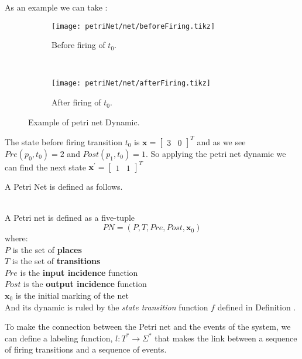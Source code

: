 As an example we can take :
\begin{figure}[H]
  \centering
 \begin{subfigure}[t]{0.45\textwidth}
  \centering
  \texttt{[image: petriNet/net/beforeFiring.tikz]}
  \caption{Before firing of $t_0$.}
  \label{fig:beforeFiring}
\end{subfigure}
~
\begin{subfigure}[t]{0.45\textwidth}
  \centering
  \texttt{[image: petriNet/net/afterFiring.tikz]}
  \caption{After firing of $t_0$.}
  \label{fig:afterFiring}
\end{subfigure}
  \caption{Example of petri net Dynamic.}
  \label{fig:petriNetDynamics}
\end{figure}
The state before firing transition $t_0$ is $\mathbf{x}=\begin{bmatrix}3&
  0\end{bmatrix}^T$ and as we see $Pre(p_0,t_0)=2$ and $Post(p_1,t_0)=1$. So
applying the petri net dynamic we can find the next state $\mathbf{x}^\prime=\begin{bmatrix}1&
  1\end{bmatrix}^T$

A Petri Net is defined as follows.

\begin{definition}
  \label{def:petriNet}~\\
  A Petri net is defined as a five-tuple
  \[PN = (P,T,Pre,Post,\mathbf{x}_0)\]
  where: \\
  \indent $P$ is the set of \textbf{places} \\
  \indent $T$ is the set of \textbf{transitions} \\
  \indent $Pre$ is the \textbf{input incidence} function  \\
  \indent $Post$ is the \textbf{output incidence} function\\
\indent $\mathbf{x}_0$ is the initial marking of the net \\
And its dynamic is ruled by the \emph{state transition} function $f$ defined in
Definition .

\end{definition}

To make the connection between the Petri net and the events of the system, we can
define a labeling function, $l : T^* \rightarrow \Sigma^*$ that makes the link between a
sequence of firing transitions and a sequence of events.

